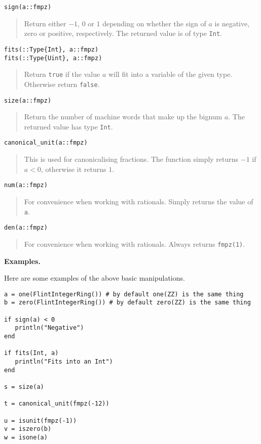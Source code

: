 \documentclass[a4paper,10pt]{article}
\newcommand{\code}{\lstinline}
\newcommand{\desc}[1]{\vspace{-3mm}\begin{quote}#1\end{quote}}
\begin{document}
\begin{lstlisting}
sign(a::fmpz)
\end{lstlisting}

\desc{Return either $-1$, $0$ or $1$ depending on whether the sign of $a$ is negative,
zero or positive, respectively. The returned value is of type \code{Int}.}

\begin{lstlisting}
fits(::Type{Int}, a::fmpz)
fits(::Type{Uint}, a::fmpz)
\end{lstlisting}

\desc{Return \code{true} if the value $a$ will fit into a variable of the given
type. Otherwise return \code{false}.}

\begin{lstlisting}
size(a::fmpz)
\end{lstlisting}

\desc{Return the number of machine words that make up the bignum $a$. The
returned value has type \code{Int}.}

\begin{lstlisting}
canonical_unit(a::fmpz)
\end{lstlisting}

\desc{This is used for canonicalising fractions. The function simply returns $-1$
if $a < 0$, otherwise it returns $1$.}

\begin{lstlisting}
num(a::fmpz)
\end{lstlisting}

\desc{For convenience when working with rationals. Simply returns the value of \code{a}.}

\begin{lstlisting}
den(a::fmpz)
\end{lstlisting}

\desc{For convenience when working with rationals. Always returns \code{fmpz(1)}.}

\textbf{Examples.}

Here are some examples of the above basic manipulations.

\begin{lstlisting}
a = one(FlintIntegerRing()) # by default one(ZZ) is the same thing 
b = zero(FlintIntegerRing()) # by default zero(ZZ) is the same thing 

if sign(a) < 0
   println("Negative")
end

if fits(Int, a)
   println("Fits into an Int")
end

s = size(a)

t = canonical_unit(fmpz(-12))

u = isunit(fmpz(-1))
v = iszero(b)
w = isone(a)
\end{lstlisting}
\end{document}
